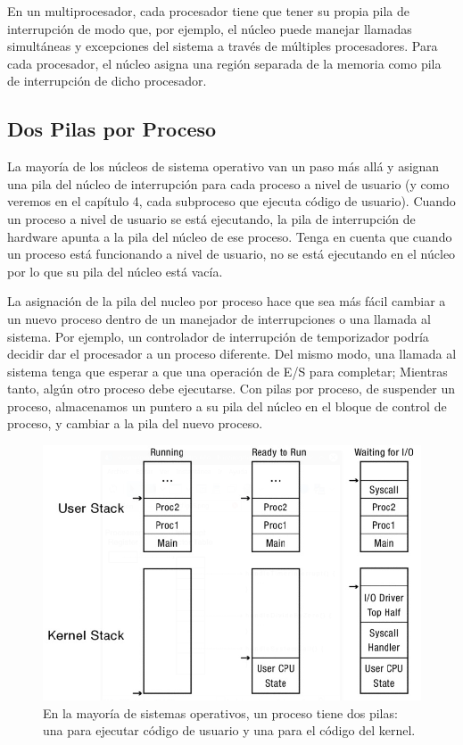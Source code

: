 \documentclass[10pt]{book}
\begin{document}
En un multiprocesador, cada procesador tiene que tener su propia pila de interrupción de modo que, por ejemplo, el núcleo puede manejar llamadas simultáneas y excepciones del sistema a través de múltiples procesadores. Para cada procesador, el núcleo asigna una región separada de la memoria como pila de interrupción de dicho procesador.

\subsection{Dos Pilas por Proceso}
La mayoría de los núcleos de sistema operativo van un paso más allá y asignan una pila del núcleo de interrupción para cada proceso a nivel de usuario (y como veremos en el capítulo 4, cada subproceso que ejecuta código de usuario). Cuando un proceso a nivel de usuario se está ejecutando, la pila de interrupción de hardware apunta a la pila del núcleo de ese proceso. Tenga en cuenta que cuando un proceso está funcionando a nivel de usuario, no se está ejecutando en el núcleo por lo que su pila del núcleo está vacía.

La asignación de la pila del nucleo por proceso hace que sea más fácil cambiar a un nuevo proceso dentro de un manejador de interrupciones o una llamada al sistema. Por ejemplo, un controlador de interrupción de temporizador podría decidir dar el procesador a un proceso diferente. Del mismo modo, una llamada al sistema tenga que esperar a que una operación de E/S para completar; Mientras tanto, algún otro proceso debe ejecutarse. Con pilas por proceso, de suspender un proceso, almacenamos un puntero a su pila del núcleo en el bloque de control de proceso, y cambiar a la pila del nuevo proceso.

\begin{figure}[tbhp]
\centerline{\includegraphics[scale=0.55]{img/fig0205}}
\caption{En la mayoría de sistemas operativos, un proceso tiene dos pilas: una para ejecutar código de usuario y una para el código del kernel.}
\label{fig0205}
\end{figure}
\end{document}
